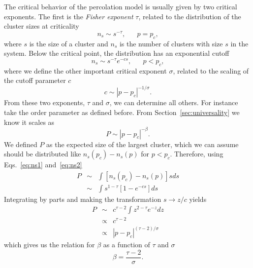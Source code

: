 The critical behavior of the percolation model is usually given by two critical
exponents. The first is the \textit{Fisher exponent} $\tau$, related to
the distribution of the cluster sizes at criticality
\begin{equation}
    \label{eq:ns1}
    n_s\sim s^{-\tau},\;\;\;\;\;\;p=p_c,
\end{equation}
where $s$ is the size of a cluster and $n_s$ is the number of clusters with
size $s$ in the system. Below the critical point, the distribution has an
exponential cutoff
\begin{equation}
    \label{eq:ns2}
    n_s\sim s^{-\tau}e^{-cs},\;\;\;\;\;\;p<p_c,
\end{equation}
where we define the other important critical exponent $\sigma$, related
to the scaling of the cutoff parameter $c$
\begin{equation}
    c\sim \left|p-p_c\right|^{-1/\sigma}.
\end{equation}
From these two exponents, $\tau$ and $\sigma$, we can determine all others.
For instance take the order parameter as defined before. From
Section~\ref{sec:universality} we know it scales as
\begin{equation}
    P\sim\left|p-p_c\right|^{-\beta}.
\end{equation}
We defined $P$ as the expected size of the largest cluster, which
we can assume should be distributed like $n_s(p_c)-n_s(p)$ for
$p < p_c$. Therefore, using Eqs.~\ref{eq:ns1} and~\ref{eq:ns2}
\begin{eqnarray}
    P & \sim & \int\left[n_{s}\left(p_{c}\right)-n_{s}\left(p\right)\right]sds\\
      & \sim & \int s^{1-\tau}\left[1-e^{-cs}\right]ds
\end{eqnarray}
Integrating by parts and making the transformation $s\rightarrow z/c$ yields
\begin{eqnarray}
P & \sim & c^{\tau-2}\int z^{2-\tau}e^{-z}dz\\
 & \propto & c^{\tau-2}\\
 & \propto & \left|p-p_{c}\right|^{\left(\tau-2\right)/\sigma}
\end{eqnarray}
which gives us the relation for $\beta$ as a function of $\tau$ and $\sigma$
\begin{equation}
    \beta=\frac{\tau-2}{\sigma}.
\end{equation}
    
